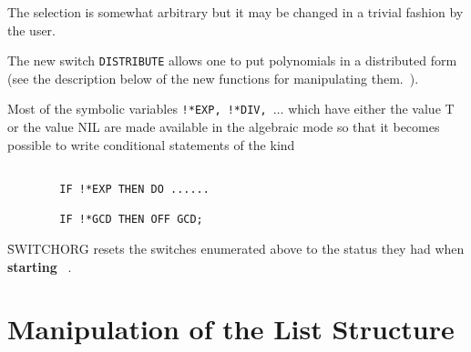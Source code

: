 The selection is somewhat arbitrary but it may be changed in a trivial
fashion by the user.

The new switch {\tt DISTRIBUTE} allows one to put polynomials in a
distributed form (see the description below of
the new functions for manipulating  them.~).

Most of the symbolic variables {\tt !*EXP, !*DIV, $\ldots$}
which have either the value T or the value NIL are made available in the
algebraic mode so that it becomes possible to write conditional
statements of the kind
\begin{verbatim}

        IF !*EXP THEN DO ......

        IF !*GCD THEN OFF GCD;

\end{verbatim}
\f{SWITCHORG} resets  the switches enumerated above to the status
they had when {\bf starting} \REDUCE\ .
\section{Manipulation of the List Structure}

